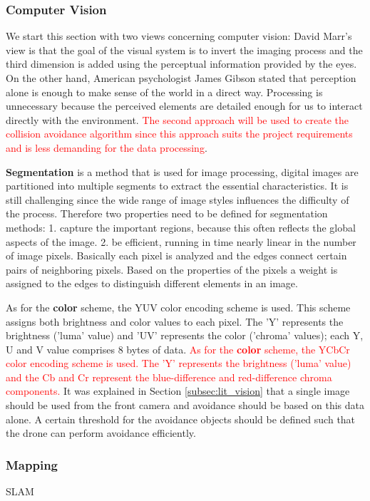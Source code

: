 \subsubsection{Computer Vision}
We start this section with two views concerning computer vision: David Marr's view is that the goal of the visual system is to invert the imaging process and the third dimension is added using the perceptual information provided by the eyes. On the other hand, American psychologist James Gibson stated that perception alone is enough to make sense of the world in a direct way. Processing is unnecessary because the perceived elements are detailed enough for us to interact directly with the environment. \textcolor{red}{The second approach will be used to create the collision avoidance algorithm since this approach suits the project requirements and is less demanding for the data processing}.

\textbf{Segmentation}\cite{pedro} is a method that is used for image processing, digital images are partitioned into multiple segments to extract the essential characteristics. It is still challenging since the wide range of image styles influences the difficulty of the process. Therefore two properties need to be defined for segmentation methods: 1. capture the important regions, because this often reflects the global aspects of the image. 2. be efficient, running in time nearly linear in the number of image pixels. Basically each pixel is analyzed and the edges connect certain pairs of neighboring pixels. Based on the properties of the pixels a weight is assigned to the edges to distinguish different elements in an image.

As for the \textbf{color} scheme, the YUV color encoding scheme is used. This scheme assigns both brightness and color values to each pixel. The 'Y' represents the brightness ('luma' value) and 'UV' represents the color ('chroma' values); each Y, U and V value comprises 8 bytes of data. 
\textcolor{red}{As for the \textbf{color} scheme, the YCbCr color encoding scheme is used. The 'Y' represents the brightness ('luma' value) and the Cb and Cr represent the blue-difference and red-difference chroma components.}
It was explained in Section \ref{subsec:lit_vision} that a single image should be used from the front camera and avoidance should be based on this data alone. A certain threshold for the avoidance objects should be defined such that the drone can perform avoidance efficiently.


\subsubsection{Mapping} SLAM

